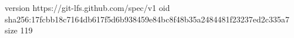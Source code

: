 version https://git-lfs.github.com/spec/v1
oid sha256:17fcbb18c7164db617f5d6b938459e84bc8f48b35a2484481f23237ed2c335a7
size 119
